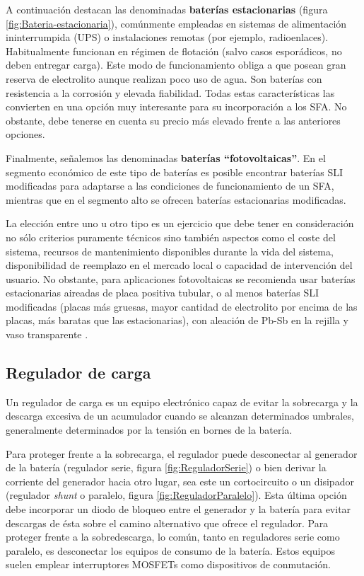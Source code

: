 A continuación destacan las denominadas \textbf{baterías estacionarias}
(figura \ref{fig:Bateria-estacionaria}), comúnmente empleadas
en sistemas de alimentación ininterrumpida (UPS) o instalaciones remotas
(por ejemplo, radioenlaces). Habitualmente funcionan en régimen de
flotación (salvo casos esporádicos, no deben entregar carga). Este
modo de funcionamiento obliga a que posean gran reserva de electrolito
aunque realizan poco uso de agua. Son baterías con resistencia a la
corrosión y elevada fiabilidad. Todas estas características las convierten
en una opción muy interesante para su incorporación a los SFA. No
obstante, debe tenerse en cuenta su precio más elevado frente a las
anteriores opciones.

Finalmente, señalemos las denominadas \textbf{baterías {}``fotovoltaicas''}.
En el segmento económico de este tipo de baterías es posible encontrar
baterías SLI modificadas para adaptarse a las condiciones de funcionamiento
de un SFA, mientras que en el segmento alto se ofrecen baterías estacionarias
modificadas.

La elección entre uno u otro tipo es un ejercicio que debe tener en
consideración no sólo criterios puramente técnicos sino también aspectos
como el coste del sistema, recursos de mantenimiento disponibles durante
la vida del sistema, disponibilidad de reemplazo en el mercado local
o capacidad de intervención del usuario. No obstante, para aplicaciones
fotovoltaicas se recomienda usar baterías estacionarias aireadas de
placa positiva tubular, o al menos baterías SLI modificadas (placas
más gruesas, mayor cantidad de electrolito por encima de las placas,
más baratas que las estacionarias), con aleación de Pb-Sb en la rejilla
y vaso transparente \cite{Egido.Lorenzo1998}.


\subsection{Regulador de carga}

Un regulador de carga es un equipo electrónico capaz de evitar la
sobrecarga y la descarga excesiva de un acumulador cuando se alcanzan
determinados umbrales, generalmente determinados por la tensión en
bornes de la batería. 

Para proteger frente a la sobrecarga, el regulador puede desconectar
al generador de la batería (regulador serie, figura \ref{fig:ReguladorSerie})
o bien derivar la corriente del generador hacia otro lugar, sea este
un cortocircuito o un disipador (regulador \emph{shunt} o paralelo,
figura \ref{fig:ReguladorParalelo}). Esta última opción debe incorporar
un diodo de bloqueo entre el generador y la batería para evitar descargas
de ésta sobre el camino alternativo que ofrece el regulador. Para
proteger frente a la sobredescarga, lo común, tanto en reguladores
serie como paralelo, es desconectar los equipos de consumo de la batería.
Estos equipos suelen emplear interruptores MOSFETs como dispositivos
de conmutación.

